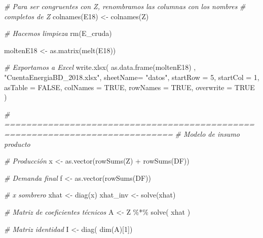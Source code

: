 \documentclass[
]{article}
\newenvironment{Shaded}{\begin{snugshade}}{\end{snugshade}}
\newcommand{\AttributeTok}[1]{\textcolor[rgb]{0.77,0.63,0.00}{#1}}
\newcommand{\CommentTok}[1]{\textcolor[rgb]{0.56,0.35,0.01}{\textit{#1}}}
\newcommand{\ConstantTok}[1]{\textcolor[rgb]{0.00,0.00,0.00}{#1}}
\newcommand{\DecValTok}[1]{\textcolor[rgb]{0.00,0.00,0.81}{#1}}
\newcommand{\FunctionTok}[1]{\textcolor[rgb]{0.00,0.00,0.00}{#1}}
\newcommand{\NormalTok}[1]{#1}
\newcommand{\OtherTok}[1]{\textcolor[rgb]{0.56,0.35,0.01}{#1}}
\newcommand{\SpecialCharTok}[1]{\textcolor[rgb]{0.00,0.00,0.00}{#1}}
\newcommand{\StringTok}[1]{\textcolor[rgb]{0.31,0.60,0.02}{#1}}
\begin{document}
\begin{Shaded}
\begin{Highlighting}[]
\CommentTok{\# Para ser congruentes con Z, renombramos las columnas con los nombres}
\CommentTok{\# completos de Z}
\FunctionTok{colnames}\NormalTok{(E18) }\OtherTok{\textless{}{-}} \FunctionTok{colnames}\NormalTok{(Z)}

\CommentTok{\# Hacemos limpieza}
\FunctionTok{rm}\NormalTok{(E\_cruda)}

\NormalTok{moltenE18 }\OtherTok{\textless{}{-}} \FunctionTok{as.matrix}\NormalTok{(}\FunctionTok{melt}\NormalTok{(E18))}

\CommentTok{\# Exportamos a Excel}
\FunctionTok{write.xlsx}\NormalTok{( }\FunctionTok{as.data.frame}\NormalTok{(moltenE18) , }
            \StringTok{"CuentaEnergiaBD\_2018.xlsx"}\NormalTok{,}
            \AttributeTok{sheetName=} \StringTok{"datos"}\NormalTok{,}
            \AttributeTok{startRow =} \DecValTok{5}\NormalTok{,}
            \AttributeTok{startCol =} \DecValTok{1}\NormalTok{,}
            \AttributeTok{asTable =} \ConstantTok{FALSE}\NormalTok{, }
            \AttributeTok{colNames =} \ConstantTok{TRUE}\NormalTok{, }
            \AttributeTok{rowNames =} \ConstantTok{TRUE}\NormalTok{, }
            \AttributeTok{overwrite =} \ConstantTok{TRUE}
\NormalTok{)}

\CommentTok{\# =============================================================================}
\CommentTok{\# Modelo de insumo producto}

\CommentTok{\# Producción}
\NormalTok{x }\OtherTok{\textless{}{-}} \FunctionTok{as.vector}\NormalTok{(}\FunctionTok{rowSums}\NormalTok{(Z) }\SpecialCharTok{+} \FunctionTok{rowSums}\NormalTok{(DF))}

\CommentTok{\# Demanda final}
\NormalTok{f }\OtherTok{\textless{}{-}} \FunctionTok{as.vector}\NormalTok{(}\FunctionTok{rowSums}\NormalTok{(DF))}

\CommentTok{\# x sombrero}
\NormalTok{xhat }\OtherTok{\textless{}{-}} \FunctionTok{diag}\NormalTok{(x)}
\NormalTok{xhat\_inv }\OtherTok{\textless{}{-}} \FunctionTok{solve}\NormalTok{(xhat)}

\CommentTok{\# Matriz de coeficientes técnicos}
\NormalTok{A }\OtherTok{\textless{}{-}}\NormalTok{ Z }\SpecialCharTok{\%*\%} \FunctionTok{solve}\NormalTok{( xhat )}

\CommentTok{\# Matriz identidad}
\NormalTok{I }\OtherTok{\textless{}{-}} \FunctionTok{diag}\NormalTok{( }\FunctionTok{dim}\NormalTok{(A)[}\DecValTok{1}\NormalTok{])}


\end{Highlighting}
\end{Shaded}
\end{document}
